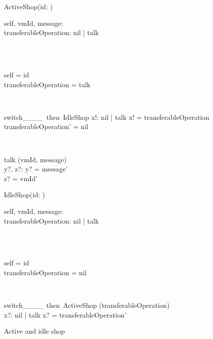\begin{figure}[H]
\centering
\begin{sidebyside}
\begin{class}{ActiveShop(id: \integer)}
\\
\begin{state}
self, vmId, message: \integer
\\transferableOperation: nil | talk
\end{state} 
\\
\begin{init}
\\self = id
\\transferableOperation = talk
\end{init} 
\\
\begin{op}{switch\_\_\_\_\ then\ IdleShop}
x!: nil | talk
\ST
x! = transferableOperation
\\transferableOperation' = nil
\end{op}
\\
\begin{op}{talk}
\Delta (vmId, message)
\\y?, z?: \integer
\ST
y? = message'
\\z? = vmId'
\end{op}
\end{class}
\nextside
\begin{class}{IdleShop(id: \integer)}
\\
\begin{state}
self, vmId, message: \integer
\\transferableOperation: nil | talk
\end{state} 
\\
\begin{init}
\\self = id
\\transferableOperation = nil
\end{init} 
\\
\begin{op}{switch\_\_\_\_\ then\ ActiveShop}
\Delta (transferableOperation)
\\x?: nil | talk
\ST
x? = transferableOperation'
\end{op}
\end{class}
\end{sidebyside}
\caption{Active and idle shop}
\label{fig_oz_active_idle_shop}
\end{figure}
